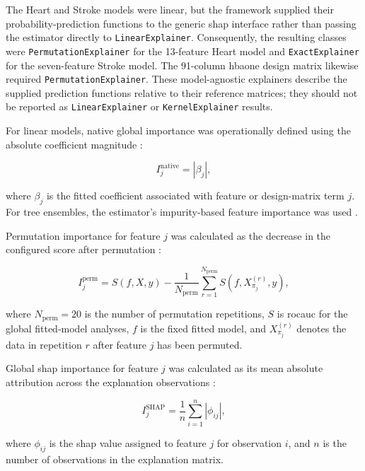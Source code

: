 The Heart and Stroke models were linear, but the framework supplied their probability-prediction functions to the generic \gls{shap} interface rather than passing the estimator directly to \texttt{LinearExplainer}. Consequently, the resulting classes were \texttt{PermutationExplainer} for the 13-feature Heart model and \texttt{ExactExplainer} for the seven-feature Stroke model. The 91-column \gls{hbaone} design matrix likewise required \texttt{PermutationExplainer}. These model-agnostic explainers describe the supplied prediction functions relative to their reference matrices; they should not be reported as \texttt{LinearExplainer} or \texttt{KernelExplainer} results.

For linear models, native global importance was operationally defined using the absolute coefficient magnitude \citep{linardatos_explainable_2020}:

\begin{equation}
I_j^{\mathrm{native}}
=
\left|\beta_j\right|,
\end{equation}

where $\beta_j$ is the fitted coefficient associated with feature or design-matrix term $j$. For tree ensembles, the estimator's impurity-based feature importance was used \citep{breiman_random_2001}.

Permutation importance for feature $j$ was calculated as the decrease in the configured score after permutation \citep{fisher_models_2019}:

\begin{equation}
I_j^{\mathrm{perm}}
=
S(f,X,y)
-
\frac{1}{N_{\mathrm{perm}}}
\sum_{r=1}^{N_{\mathrm{perm}}}
S\left(f,X_{\pi_j}^{(r)},y\right),
\end{equation}

where $N_{\mathrm{perm}}=20$ is the number of permutation repetitions, $S$ is \gls{rocauc} for the global fitted-model analyses, $f$ is the fixed fitted model, and $X_{\pi_j}^{(r)}$ denotes the data in repetition $r$ after feature $j$ has been permuted.

Global \gls{shap} importance for feature $j$ was calculated as its mean absolute attribution across the explanation observations \citep{NIPS2017_8a20a862}:

\begin{equation}
I_j^{\mathrm{SHAP}}
=
\frac{1}{n}
\sum_{i=1}^{n}
\left|\phi_{ij}\right|,
\end{equation}

where $\phi_{ij}$ is the \gls{shap} value assigned to feature $j$ for observation $i$, and $n$ is the number of observations in the explanation matrix.

